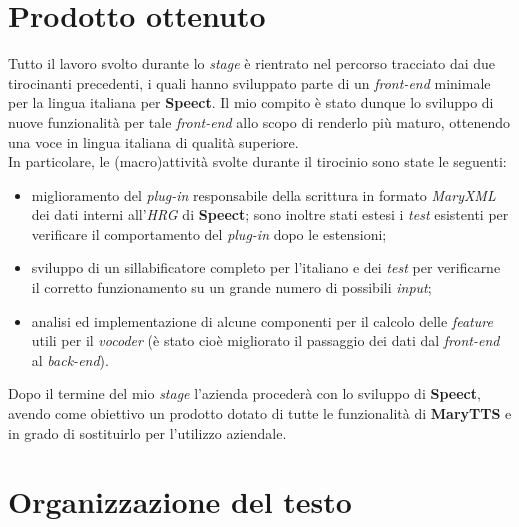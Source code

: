 \section{Prodotto ottenuto}
Tutto il lavoro svolto durante lo \textit{stage} è rientrato nel percorso tracciato dai due tirocinanti
precedenti, i quali hanno sviluppato parte di un \textit{front-end} minimale per la lingua italiana per \textbf{Speect}.
Il mio compito è stato dunque lo sviluppo di nuove funzionalità per tale \textit{front-end} allo scopo di 
renderlo più maturo, ottenendo una voce in lingua italiana di qualità superiore.\\
In particolare, le (macro)attività svolte durante il tirocinio sono state le seguenti:
    \begin{itemize} 
       \item miglioramento del \textit{plug-in} responsabile della scrittura in formato \textit{MaryXML}
             dei dati interni all'\textit{HRG} di \textbf{Speect}; sono inoltre stati estesi i \textit{test} esistenti
             per verificare il comportamento del \textit{plug-in} dopo le estensioni;
       \item sviluppo di un sillabificatore completo per l'italiano e dei \textit{test} per 
             verificarne il corretto funzionamento su un grande numero di possibili \textit{input};
       \item analisi ed implementazione di alcune componenti per il calcolo 
             delle \textit{feature} utili per il \textit{vocoder} (è stato cioè migliorato il passaggio
             dei dati dal \textit{front-end} al \textit{back-end}). \\
    \end{itemize}
Dopo il termine del mio \textit{stage} l'azienda procederà con lo sviluppo di \textbf{Speect}, avendo come obiettivo
un prodotto dotato di tutte le funzionalità di \textbf{MaryTTS} e in grado di sostituirlo per l'utilizzo aziendale. 


\newpage
\section{Organizzazione del testo}

